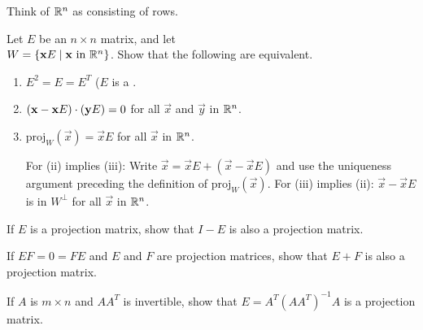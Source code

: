 \documentclass{ximera}
\begin{document}
\begin{problem}
Think of $\mathbb{R}^n$ as consisting of rows.

\begin{problem}\label{prob:8_1_17.1}
\item Let $E$ be an $n \times n$ matrix, and let \\ $W = \{\mathbf{x} E \mid \mathbf{x} \mbox{ in } \mathbb{R}^n\}$. Show that the following are equivalent.


\begin{enumerate}
\item $E^{2} = E = E^{T}$ ($E$ is a .

\item $(\mathbf{x} - \mathbf{x}E) \cdot (\mathbf{y}E) = 0$ for all $\vec{x}$ and $\vec{y}$ in $\mathbb{R}^n$.

\item $\mbox{proj}_W(\vec{x}) = \vec{x}E$ for all $\vec{x}$ in $\mathbb{R}^n$.
\begin{hint}
For (ii) implies (iii): Write $\vec{x} = \vec{x}E + (\vec{x} - \vec{x}E)$ and use the uniqueness argument preceding the definition of $\mbox{proj}_W(\vec{x})$. For (iii) implies (ii): $\vec{x} - \vec{x}E$ is in $W^\perp$ for all $\vec{x}$ in $\mathbb{R}^n$.
\end{hint}
\end{enumerate}
\end{problem}

\begin{problem}\label{prob:8_1_17.2}
If $E$ is a projection matrix, show that $I - E$ is also a projection matrix.
\end{problem}

\begin{problem}\label{prob:8_1_17.3}
If $EF = 0 = FE$ and $E$ and $F$ are projection matrices, show that $E + F$ is also a projection matrix.

\end{problem}

\begin{problem}\label{prob:8_1_17.4}
If $A$ is $m \times n$ and $AA^{T}$ is invertible, show that $E = A^{T}(AA^{T})^{-1}A$ is a projection matrix.
\end{problem}

\end{problem}
\end{document}
